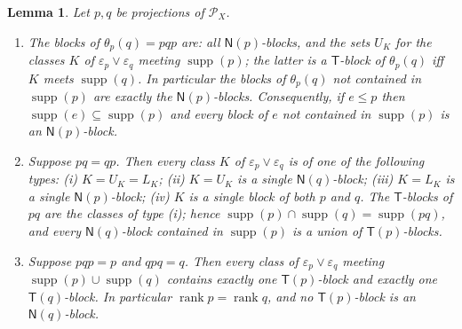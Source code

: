 \documentclass[11pt]{amsart}
\newtheorem{lemma}[theorem]{Lemma}
\theoremstyle{definition}
\renewcommand{\P}{\mathcal{P}}
\newcommand{\supp}{\operatorname{supp}}
\newcommand{\T}{\mathsf{T}}
\newcommand{\N}{\mathsf{N}}
\newcommand{\rk}{\operatorname{rank}}
\begin{document}
\begin{lemma}\label{lem:PX}
Let $p,q$ be projections of $\P_X$.
\begin{enumerate}[label=\textup{(\alph*)}]
\item The blocks of $\theta_p(q)=pqp$ are: all $\N(p)$-blocks, and the sets $U_K$ for the classes $K$ of $\varepsilon_p\vee\varepsilon_q$ meeting $\supp(p)$; the latter is a $\T$-block of $\theta_p(q)$ iff $K$ meets $\supp(q)$. In particular the blocks of $\theta_p(q)$ not contained in $\supp(p)$ are exactly the $\N(p)$-blocks. Consequently, if $e\le p$ then $\supp(e)\subseteq\supp(p)$ and every block of $e$ not contained in $\supp(p)$ is an $\N(p)$-block.
\item Suppose $pq=qp$. Then every class $K$ of $\varepsilon_p\vee\varepsilon_q$ is of one of the following types: \textup{(i)} $K=U_K=L_K$; \textup{(ii)} $K=U_K$ is a single $\N(q)$-block; \textup{(iii)} $K=L_K$ is a single $\N(p)$-block; \textup{(iv)} $K$ is a single block of both $p$ and $q$. The $\T$-blocks of $pq$ are the classes of type \textup{(i)}; hence $\supp(p)\cap\supp(q)=\supp(pq)$, and every $\N(q)$-block contained in $\supp(p)$ is a union of $\T(p)$-blocks.
\item Suppose $pqp=p$ and $qpq=q$. Then every class of $\varepsilon_p\vee\varepsilon_q$ meeting $\supp(p)\cup\supp(q)$ contains exactly one $\T(p)$-block and exactly one $\T(q)$-block. In particular $\rk p=\rk q$, and no $\T(p)$-block is an $\N(q)$-block.
\end{enumerate}
\end{lemma}
\end{document}
